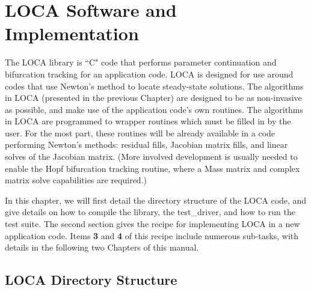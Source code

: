 \chapter{LOCA Software and Implementation}
\label{ch:implementation}

The LOCA library is ``C" code that performs parameter continuation and bifurcation tracking for an application code. LOCA is designed for use around codes that use Newton's method to locate steady-state solutions. The algorithms in LOCA (presented in the previous Chapter) are designed to be as non-invasive as possible, and make use of the application code's own routines. The algorithms in LOCA are programmed to wrapper routines which must be filled in by the user. For the most part, these routines will be already available in a code performing Newton's methods: residual fills, Jacobian matrix fills, and linear solves of the Jacobian matrix. (More involved development is usually needed to enable the Hopf bifurcation tracking routine, where a Mass matrix and complex matrix solve capabilities are required.)

In this chapter, we will first detail the directory structure of the LOCA code, 
and give details on how to compile the library, the test\_driver, and how to
run the test suite. The second section gives the recipe for implementing LOCA in a new application code. Items {\bf 3} and {\bf 4} of this recipe 
include numerous sub-tasks, with details in the following two Chapters of this manual.

\section{LOCA Directory Structure}

